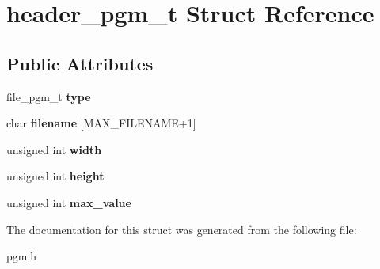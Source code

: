 \hypertarget{structheader__pgm__t}{}\section{header\+\_\+pgm\+\_\+t Struct Reference}
\label{structheader__pgm__t}
\subsection*{Public Attributes}
\begin{DoxyCompactItemize}
\item 
\hypertarget{structheader__pgm__t_a188bc309b5c2ab1b1545b99e45e380d5}{}file\+\_\+pgm\+\_\+t {\bfseries type}\label{structheader__pgm__t_a188bc309b5c2ab1b1545b99e45e380d5}

\item 
\hypertarget{structheader__pgm__t_a1fb00eced755679f5a7052b4001a9915}{}char {\bfseries filename} \mbox{[}M\+A\+X\+\_\+\+F\+I\+L\+E\+N\+A\+M\+E+1\mbox{]}\label{structheader__pgm__t_a1fb00eced755679f5a7052b4001a9915}

\item 
\hypertarget{structheader__pgm__t_a5a40a90e18023dd1e8cf6a3a32fd7b69}{}unsigned int {\bfseries width}\label{structheader__pgm__t_a5a40a90e18023dd1e8cf6a3a32fd7b69}

\item 
\hypertarget{structheader__pgm__t_af52965b6364de44ea4f98470eb680eee}{}unsigned int {\bfseries height}\label{structheader__pgm__t_af52965b6364de44ea4f98470eb680eee}

\item 
\hypertarget{structheader__pgm__t_a692cf9bfee07fd6d179c1d13b8cb3391}{}unsigned int {\bfseries max\+\_\+value}\label{structheader__pgm__t_a692cf9bfee07fd6d179c1d13b8cb3391}

\end{DoxyCompactItemize}


The documentation for this struct was generated from the following file\+:\begin{DoxyCompactItemize}
\item 
pgm.\+h\end{DoxyCompactItemize}

